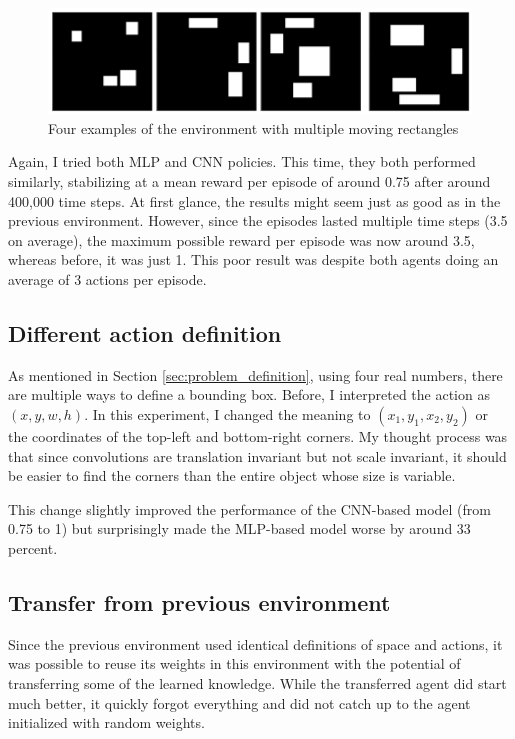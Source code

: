 \documentclass[
  digital,     %
  oneside,     %
  nosansbold,  %
  nocolorbold, %
  lof,         %
  lot,         %
]{fithesis4}
\begin{document}
\begin{figure}
    \includegraphics[width=1\linewidth]{env_examples/env3.png}
    \caption{Four examples of the environment with multiple moving rectangles}
    \label{fig:env3}
\end{figure}

Again, I tried both MLP and CNN policies. This time, they both performed similarly, stabilizing at a mean reward per episode of around 0.75 after around 400,000 time steps. At first glance, the results might seem just as good as in the previous environment. However, since the episodes lasted multiple time steps (3.5 on average), the maximum possible reward per episode was now around 3.5, whereas before, it was just 1. This poor result was despite both agents doing an average of 3 actions per episode.

\subsection{Different action definition}
\label{subsec:different_rect_repr}

As mentioned in Section \ref{sec:problem_definition}, using four real numbers, there are multiple ways to define a bounding box. Before, I interpreted the action as $(x, y, w, h)$. In this experiment, I changed the meaning to $(x_1, y_1, x_2, y_2)$ or the coordinates of the top-left and bottom-right corners. My thought process was that since convolutions are translation invariant but not scale invariant, it should be easier to find the corners than the entire object whose size is variable.

This change slightly improved the performance of the CNN-based model (from 0.75 to 1) but surprisingly made the MLP-based model worse by around 33 percent.

\subsection{Transfer from previous environment}

Since the previous environment used identical definitions of space and actions, it was possible to reuse its weights in this environment with the potential of transferring some of the learned knowledge. While the transferred agent did start much better, it quickly forgot everything and did not catch up to the agent initialized with random weights.
\end{document}
